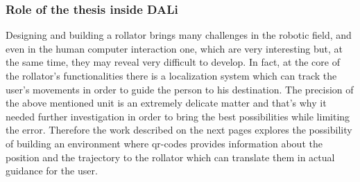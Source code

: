 \subsubsection{Role of the thesis inside DALi}
\vspace{0.5cm}
Designing and building a rollator brings many challenges in the robotic field, and even in the human computer interaction one, which are very interesting but, at the same time, they may reveal very difficult to develop. 
In fact, at the core of the rollator's functionalities there is a localization system which can track the user's movements in order to guide the person to his destination.
The precision of the above mentioned unit is an extremely delicate matter and that's why it needed further investigation in order to bring the best possibilities while limiting the error.
Therefore the work described on the next pages explores the possibility of building an environment where qr-codes provides information about the position and the trajectory to the rollator which can translate them in actual guidance for the user. 






  
